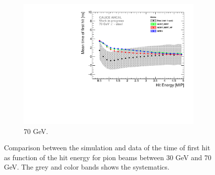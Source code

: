 \begin{figure}[htbp!]
  \hfill
  \begin{subfigure}[t]{0.49\textwidth}
    \centering
    \includegraphics[width=1\textwidth]{../Thesis_Plots/Timing/Pions/Plots/ComparisonToSim/Time_Energy_70GeV_Mokka.pdf}
    \caption{70 GeV.} \label{fig:Energy_SimData_70GeV}
  \end{subfigure}
  \caption{Comparison between the \mokka simulation and data of the time of first hit as function of the hit energy for pion beams between 30 GeV and 70 GeV. The grey and color bands shows the systematics.}
\end{figure}

